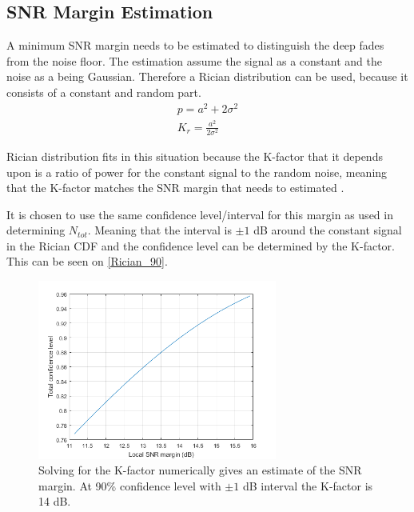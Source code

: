 \subsection{SNR Margin Estimation}
\label{SNR_margin}
A minimum SNR margin needs to be estimated to distinguish the deep fades from the noise floor. %
The estimation assume the signal as a constant and the noise as a being Gaussian. Therefore a Rician distribution can be used, because it consists of a constant and random part.
\begin{align}
p = a^2 + 2\sigma^2 \\
K_r = \frac{a^2}{2\sigma^2}
\end{align}

\begin{where}
\end{where}

Rician distribution fits in this situation because the K-factor that it depends upon is a ratio of power for the constant signal to the random noise, meaning that the K-factor matches the \gls{SNR} margin that needs to estimated \cite[p.308]{Fading_Shadowing}.

It is chosen to use the same confidence level/interval for this margin as used in determining $N_{tot}$. Meaning that the interval is $\pm 1$ dB around the constant signal in the Rician \gls{CDF} and the confidence level can be determined by the K-factor. This can be seen on \autoref{Rician_90}.

\begin{figure}[H]
\centering
\includegraphics[width=0.70\textwidth]{figures/SNR_margin.png}
\caption{Solving for the K-factor numerically gives an estimate of the SNR margin. At 90\% confidence level with $\pm 1$ dB interval the K-factor is 14 dB.}
\label{Rician_90}
\end{figure}


